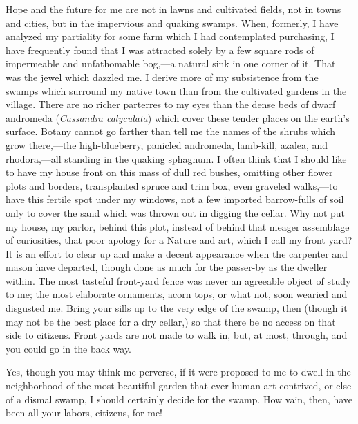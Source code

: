 \documentclass[twoside,openright,10pt]{memoir} %
\begin{document}
Hope and the future for me are not in lawns and cultivated fields, not in towns and cities, but in the impervious and quaking swamps. When, formerly, I have analyzed my partiality for some farm which I had contemplated purchasing, I have frequently found that I was attracted solely by a few square rods of impermeable and unfathomable bog,—a natural sink in one corner of it. That was the jewel which dazzled me. I derive more of my subsistence from the swamps which surround my native town than from the cultivated gardens in the village. There are no richer parterres to my eyes than the dense beds of dwarf andromeda (\emph{Cassandra calyculata}) which cover these tender places on the earth’s surface. Botany cannot go farther than tell me the names of the shrubs which grow there,—the high-blueberry, panicled andromeda, lamb-kill, azalea, and rhodora,—all standing in the quaking sphagnum. I often think that I should like to have my house front on this mass of dull red bushes, omitting other flower plots and borders, transplanted spruce and trim box, even graveled walks,—to have this fertile spot under my windows, not a few imported barrow-fulls of soil only to cover the sand which was thrown out in digging the cellar. Why not put my house, my parlor, behind this plot, instead of behind that meager assemblage of curiosities, that poor apology for a Nature and art, which I call my front yard? It is an effort to clear up and make a decent appearance when the carpenter and mason have departed, though done as much for the passer-by as the dweller within. The most tasteful front-yard fence was never an agreeable object of study to me; the most elaborate ornaments, acorn tops, or what not, soon wearied and disgusted me. Bring your sills up to the very edge of the swamp, then (though it may not be the best place for a dry cellar,) so that there be no access on that side to citizens. Front yards are not made to walk in, but, at most, through, and you could go in the back way.

Yes, though you may think me perverse, if it were proposed to me to dwell in the neighborhood of the most beautiful garden that ever human art contrived, or else of a dismal swamp, I should certainly decide for the swamp. How vain, then, have been all your labors, citizens, for me!
\end{document}
